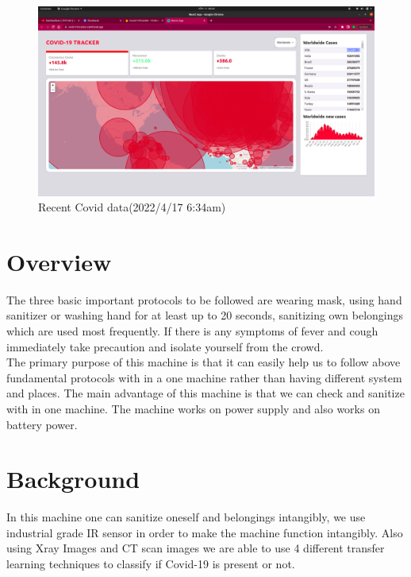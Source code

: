 \documentclass[a4paper,12pt]{report}
\begin{document}
\begin{figure}[h] %
   \begin{center}
   \includegraphics[scale=0.25]{data_covid.png}
   \caption{Recent Covid data(2022/4/17 6:34am)}
  \end{center}
  \end{figure}
  \pagebreak
  




\section{Overview}
The three basic important protocols to be followed are wearing mask, using hand sanitizer
or washing hand for at least up to 20 seconds, sanitizing own belongings which are used most
frequently. If there is any symptoms of fever and cough immediately take precaution and
isolate yourself from the crowd.
\\The primary purpose of this machine is that it can easily help us to follow above fundamental
protocols with in a one machine rather than having different system and places. The main
advantage of this machine is that we can check and sanitize with in one machine. The
machine works on power supply and also works on battery power.
\section{Background}
In this machine one can sanitize oneself and belongings intangibly, we use industrial grade
IR sensor in order to make the machine function intangibly. Also using Xray Images and CT scan images we are able to use 4 different transfer learning techniques to classify if Covid-19 is present or not.
\end{document}
